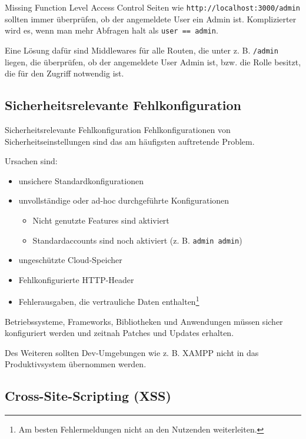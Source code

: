 \begin{example}{Missing Function Level Access Control}
    Seiten wie \texttt{http://localhost:3000/admin} sollten immer überprüfen, ob der angemeldete User ein Admin ist.
    Komplizierter wird es, wenn man mehr Abfragen halt als \texttt{user == admin}.

    Eine Lösung dafür sind Middlewares für alle Routen, die unter z. B. \texttt{/admin} liegen, die überprüfen, ob der angemeldete User Admin ist, bzw. die Rolle besitzt, die für den Zugriff notwendig ist.
\end{example}

\subsection{Sicherheitsrelevante Fehlkonfiguration}

\begin{defi}{Sicherheitsrelevante Fehlkonfiguration}
    Fehlkonfigurationen von Sicherheitseinstellungen sind das am häufigsten auftretende Problem.

    Ursachen sind:
    \begin{itemize}
        \item unsichere Standardkonfigurationen
        \item unvollständige oder ad-hoc durchgeführte Konfigurationen
              \begin{itemize}
                  \item Nicht genutzte Features sind aktiviert
                  \item Standardaccounts sind noch aktiviert (z. B. \texttt{admin admin})
              \end{itemize}
        \item ungeschützte Cloud-Speicher
        \item Fehlkonfigurierte HTTP-Header
        \item Fehlerausgaben, die vertrauliche Daten enthalten\footnote{Am besten Fehlermeldungen nicht an den Nutzenden weiterleiten.}
    \end{itemize}

    Betriebssysteme, Frameworks, Bibliotheken und Anwendungen müssen sicher konfiguriert werden und zeitnah Patches und Updates erhalten.

    Des Weiteren sollten Dev-Umgebungen wie z. B. XAMPP nicht in das Produktivsystem übernommen werden.
\end{defi}

\subsection{Cross-Site-Scripting (XSS)}

